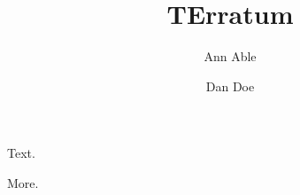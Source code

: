 \documentclass[aps,prl]{revtex4-2}
\begin{document}
\title{T}
\author{Ann Able}
\maketitle
Text.
\clearpage
\title{Erratum}
\author{Dan Doe}
\maketitle
More.
\end{document}
